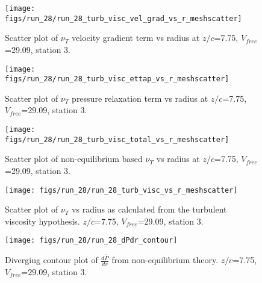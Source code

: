 \begin{figure}[H]
\centering
\texttt{[image: figs/run\_28/run\_28\_turb\_visc\_vel\_grad\_vs\_r\_meshscatter]}
\caption{Scatter plot of $\nu_T$ velocity gradient term vs radius at $z/c$=7.75, $V_{free}$=29.09, station 3.}
\end{figure}


\begin{figure}[H]
\centering
\texttt{[image: figs/run\_28/run\_28\_turb\_visc\_ettap\_vs\_r\_meshscatter]}
\caption{Scatter plot of $\nu_T$ pressure relaxation term vs radius at $z/c$=7.75, $V_{free}$=29.09, station 3.}
\end{figure}


\begin{figure}[H]
\centering
\texttt{[image: figs/run\_28/run\_28\_turb\_visc\_total\_vs\_r\_meshscatter]}
\caption{Scatter plot of non-equilibrium based $\nu_T$ vs radius at $z/c$=7.75, $V_{free}$=29.09, station 3.}
\end{figure}


\begin{figure}[H]
\centering
\texttt{[image: figs/run\_28/run\_28\_turb\_visc\_vs\_r\_meshscatter]}
\caption{Scatter plot of $\nu_T$ vs radius as calculated from the turbulent viscosity hypothesis. $z/c$=7.75, $V_{free}$=29.09, station 3.}
\end{figure}


\begin{figure}[H]
\centering
\texttt{[image: figs/run\_28/run\_28\_dPdr\_contour]}
\caption{Diverging contour plot of $\frac{d\bar{P}}{dr}$ from non-equilibrium theory. $z/c$=7.75, $V_{free}$=29.09, station 3.}
\end{figure}


